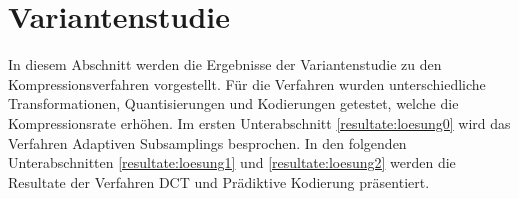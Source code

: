 \section{Variantenstudie}\label{resultate}
In diesem Abschnitt werden die Ergebnisse der Variantenstudie zu den Kompressionsverfahren vorgestellt. Für die Verfahren wurden unterschiedliche Transformationen, Quantisierungen und Kodierungen getestet, welche die Kompressionsrate erhöhen. Im ersten Unterabschnitt \ref{resultate:loesung0} wird das Verfahren Adaptiven Subsamplings besprochen. In den folgenden Unterabschnitten \ref{resultate:loesung1} und \ref{resultate:loesung2} werden die Resultate der Verfahren DCT und Prädiktive Kodierung präsentiert.


\pagebreak

\pagebreak

